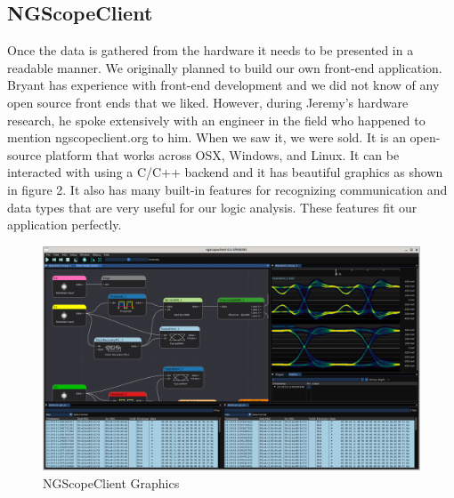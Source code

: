 \subsection{NGScopeClient}
	Once the data is gathered from the hardware it needs to be presented in a readable manner. We originally planned to build our own front-end application. Bryant has experience with front-end development and we did not know of any open source front ends that we liked. However, during Jeremy's hardware research, he spoke extensively with an engineer in the field who happened to mention ngscopeclient.org to him. When we saw it, we were sold. It is an open-source platform that works across OSX, Windows, and Linux. It can be interacted with using a C/C++ backend and it has beautiful graphics as shown in figure 2. It also has many built-in features for recognizing communication and data types that are very useful for our logic analysis. These features fit our application perfectly. 
	
		\begin{figure}[H]
		\centering
		\includegraphics[width=0.8\linewidth]{images/ngscopeclient-intro.png}
		\caption{NGScopeClient Graphics \cite{ngscope_intro}}
		\label{fig:ngscope-client}
		\vspace{15px}
	\end{figure}
	

	‌